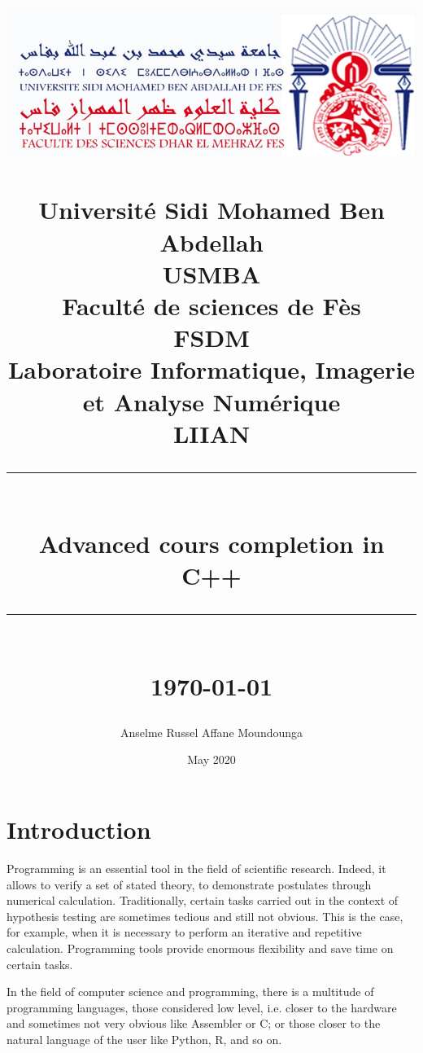 \documentclass[12pt]{report}
\newcommand{\HRule}[1]{\rule{\linewidth}{#1}}
\begin{document}
\title{ 
        \includegraphics[width=.5\textwidth]{fsdm.png}~\\[.5cm]
        \normalsize Université Sidi Mohamed Ben            Abdellah \\ 
        USMBA\\
		Faculté de sciences de Fès\\
		FSDM\\
		Laboratoire Informatique, Imagerie et Analyse Numérique\\
		LIIAN
		\\ [2.0cm]
		\HRule{0.5pt} \\
		\LARGE \textbf{Advanced cours completion in C++} %
		\HRule{2pt} \\ [0.5cm]
		\normalsize \today \vspace*{5\baselineskip}}

\author{Anselme Russel Affane Moundounga}
\date{May 2020}

\maketitle
\tableofcontents

\newpage
\chapter{Introduction}

Programming is an essential tool in the field of scientific research. Indeed, it allows to verify a set of stated theory, to demonstrate postulates through numerical calculation. Traditionally, certain tasks carried out in the context of hypothesis testing are sometimes tedious and still not obvious. This is the case, for example, when it is necessary to perform an iterative and repetitive calculation. Programming tools provide enormous flexibility and save time on certain tasks.

In the field of computer science and programming, there is a multitude of programming languages, those considered low level, i.e. closer to the hardware and sometimes not very obvious like Assembler or C; or those closer to the natural language of the user like Python, R, and so on.
\end{document}

